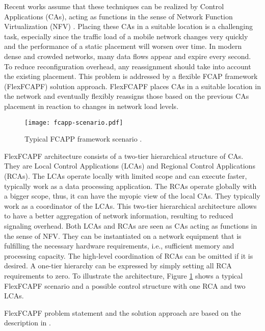 Recent works \cite{7343600} \cite{aurouxew2017} assume that these techniques can be realized by Control Applications (CAs), acting as functions in the sense of Network Function Virtualization (NFV) \cite{nfv-arch}. Placing these CAs in a suitable location is a challenging task, especially since the traffic load of a mobile network changes very quickly and the performance of a static placement will worsen over time. In modern dense and crowded networks, many data flows appear and expire every second. To reduce reconfiguration overhead, any reassignment should take into account the existing placement. This problem is addressed by a flexible FCAP framework (FlexFCAPF) solution approach. FlexFCAPF places CAs in a suitable location in the network and eventually flexibly reassigns those based on the previous CAs placement in reaction to changes in network load levels.

\begin{figure}[H]
\begin{center}
	\resizebox{\textwidth}{!}
	{\texttt{[image: fcapp-scenario.pdf]}}
	\caption{Typical FCAPP framework scenario \cite{aurouxew2017}.}
	\label{fig:fcpfscenario}
\end{center}
\end{figure}

FlexFCAPF architecture consists of a two-tier hierarchical structure of CAs. They are Local Control Applications (LCAs) and Regional Control Applications (RCAs). The LCAs operate locally with limited scope and can execute faster, typically work as a data processing application. The RCAs operate globally with a bigger scope, thus, it can have the myopic view of the local CAs. They typically work as a coordinator of the LCAs. This two-tier hierarchical architecture allows to have a better aggregation of network information, resulting to reduced signaling overhead. Both LCAs and RCAs are seen as CAs acting as functions in the sense of NFV. They can be instantiated on a network equipment that is fulfilling the necessary hardware requirements, i.e., sufficient memory and processing capacity. The high-level coordination of RCAs can be omitted if it is desired. A one-tier hierarchy can be expressed by simply setting all RCA requirements to zero. To illustrate the architecture, Figure \ref{fig:fcpfscenario} shows a typical FlexFCAPF scenario and a possible control structure with one RCA and two LCAs.

FlexFCAPF problem statement and the solution approach are based on the description in \cite{7343600} \cite{aurouxew2017}.
